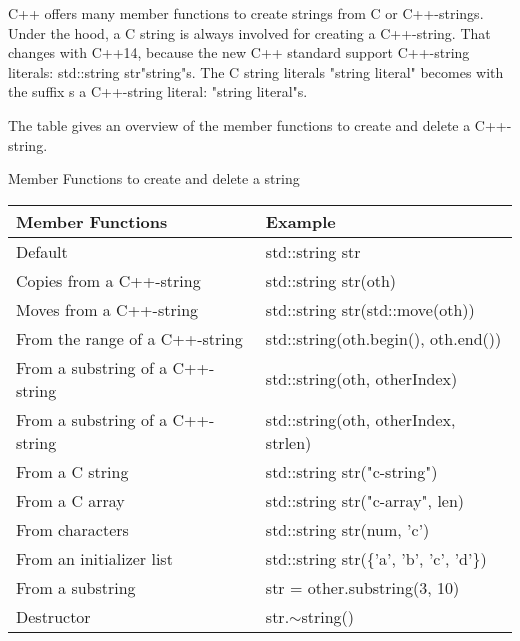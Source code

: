 C++ offers many member functions to create strings from C or C++-strings. Under the hood, a C string is always involved for creating a C++-string. That changes with C++14, because the new C++ standard support C++-string literals: std::string str{"string"s}. The C string literals "string literal" becomes with the suffix s a C++-string literal: "string literal"s.

The table gives an overview of the member functions to create and delete a C++-string.

\begin{center}
Member Functions to create and delete a string
\end{center}

\begin{longtable}[c]{|l|l|}
\hline
\textbf{Member Functions}        & \textbf{Example}                        \\ \hline
\endfirsthead
%
\endhead
%
Default                          & std::string str                         \\ \hline
Copies from a C++-string         & std::string str(oth)                    \\ \hline
Moves from a C++-string          & std::string str(std::move(oth))         \\ \hline
From the range of a C++-string   & std::string(oth.begin(), oth.end())     \\ \hline
From a substring of a C++-string & std::string(oth, otherIndex)            \\ \hline
From a substring of a C++-string & std::string(oth, otherIndex, strlen)    \\ \hline
From a C string                  & std::string str("c-string")             \\ \hline
From a C array                   & std::string str("c-array", len)         \\ \hline
From characters                  & std::string str(num, 'c')               \\ \hline
From an initializer list         & std::string str(\{'a', 'b', 'c', 'd'\}) \\ \hline
From a substring                 & str = other.substring(3, 10)            \\ \hline
Destructor                       & str.$\sim$string()                      \\ \hline
\end{longtable}

